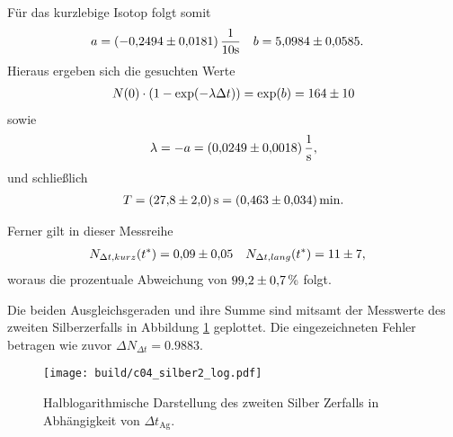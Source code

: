 \noindent
Für das kurzlebige Isotop folgt somit 
\begin{align}
    a &= (\num{-0.2494 +- 0.0181}) \, \frac{1}{10 \unit{\second}}  & b &= \num{5.0984 +-0.0585}.
\end{align}
Hieraus ergeben sich die gesuchten Werte
\begin{align}
    N(0) \cdot \left(1- \exp(- \lambda \Delta t)\right) = \exp(b) = \num[]{164 +- 10}
\end{align}
sowie 
\begin{align}
    \lambda = - a = \qty[]{0.0249 +- 0.0018}{\per\second},
\end{align}
und schließlich
\begin{align}
    T = \qty[]{27.8 +- 2.0}{\second} = \qty[]{0.463 +- 0.034}{\minute}.
\end{align}

\noindent
Ferner gilt in dieser Messreihe
\begin{align*}
    N_{\Delta t,kurz}(t^*) &= \num[]{0.09 +- 0.05} & N_{\Delta t,lang}(t^*) &= \num[]{11 +- 7}, 
\end{align*}
woraus die prozentuale Abweichung von $\num[]{99.2 +- 0.7} \, \%$ folgt.

\noindent
Die beiden Ausgleichsgeraden und ihre Summe sind mitsamt der Messwerte des zweiten Silberzerfalls in Abbildung \ref{fig:silber2_log} geplottet.
Die eingezeichneten Fehler betragen wie zuvor $\Delta N_{\Delta t} = \num{0.9883}$.


\begin{figure}[H]
    \centering
    \texttt{[image: build/c04\_silber2\_log.pdf]}
    \caption[]{Halblogarithmische Darstellung des zweiten Silber Zerfalls in Abhängigkeit von $\Delta t_\text{Ag}$.}
    \label{fig:silber2_log}
\end{figure}